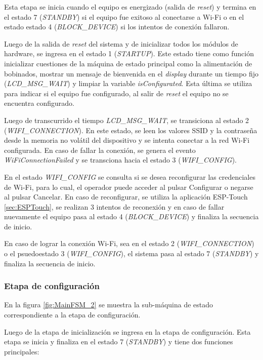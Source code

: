 Esta etapa se inicia cuando el equipo es energizado (salida de \textit{reset}) y termina en el estado 7 (\textit{STANDBY}) si el equipo fue exitoso al conectarse a Wi-Fi o en el estado estado 4 (\textit{BLOCK\_DEVICE}) si los intentos de conexión fallaron. 

Luego de la salida de \textit{reset} del sistema y de inicializar todos los módulos de hardware, se ingresa en el estado 1 (\textit{STARTUP}). Este estado tiene como función inicializar cuestiones de la máquina de estado principal como la alimentación de bobinados, mostrar un mensaje de bienvenida en el \textit{display} durante un tiempo fijo (\textit{LCD\_MSG\_WAIT}) y limpiar la variable \textit{isConfigurated}. Esta última se utiliza para indicar si el equipo fue configurado, al salir de \textit{reset} el equipo no se encuentra configurado.

Luego de transcurrido el tiempo \textit{LCD\_MSG\_WAIT}, se transiciona al estado 2 (\textit{WIFI\_CONNECTION}). En este estado, se leen los valores SSID y la contraseña desde la memoria no volátil del dispositivo y se intenta conectar a la red Wi-Fi configurada. En caso de fallar la conexión, se genera el evento \textit{WiFiConnectionFailed} y se transciona hacia el estado 3 (\textit{WIFI\_CONFIG}). 

En el estado \textit{WIFI\_CONFIG} se consulta si se desea reconfigurar las credenciales de Wi-Fi, para lo cual, el operador puede acceder al pulsar Configurar o negarse al pulsar Cancelar. En caso de reconfigurar, se utiliza la aplicación ESP-Touch \ref{sec:ESPTouch}, se realizan 3 intentos de reconexión y en caso de fallar nuevamente el equipo pasa al estado 4 (\textit{BLOCK\_DEVICE}) y finaliza la secuencia de inicio.

En caso de lograr la conexión Wi-Fi, sea en el estado 2 (\textit{WIFI\_CONNECTION}) o el psuedoestado 3 (\textit{WIFI\_CONFIG}), el sistema pasa al estado 7 (\textit{STANDBY}) y finaliza la secuencia de inicio.

\subsubsection{Etapa de configuración}
\label{subsubsec:EtConf}
En la figura \ref{fig:MainFSM_2} se muestra la sub-máquina de estado correspondiente a la etapa de configuración. 

Luego de la etapa de inicialización se ingresa en la etapa de configuración. Esta etapa se inicia y finaliza en el estado 7 (\textit{STANDBY}) y tiene dos funciones principales:


